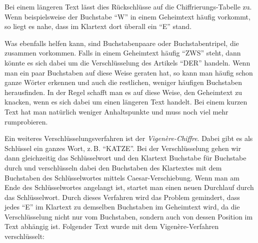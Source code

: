 \documentclass[a4paper,ngerman,12pt]{scrartcl}
\theoremstyle{definition}
\begin{document}
Bei einem längeren Text lässt dies Rückschlüsse auf die Chiffrierungs-Tabelle zu. Wenn beispielsweise der Buchstabe "`W"' in einem Geheimtext häufig vorkommt, so liegt es nahe, dass im Klartext dort überall ein "`E"' stand.

Was ebenfalls helfen kann, sind Buchstabenpaare oder Buchstabentripel, die zusammen vorkommen. Falls in einem Geheimtext häufig "`ZWS"' steht, dann könnte es sich dabei um die Verschlüsselung des Artikels "`DER"' handeln. Wenn man ein paar Buchstaben auf diese Weise geraten hat, so kann man häufig schon ganze Wörter erkennen und auch die restlichen, weniger häufigen Buchstaben herausfinden. In der Regel schafft man es auf diese Weise, den Geheimtext zu knacken, wenn es sich dabei um einen längeren Text handelt. Bei einem kurzen Text hat man natürlich weniger Anhaltspunkte und muss noch viel mehr rumprobieren.

Ein weiteres Verschlüsselungsverfahren ist der \emph{Vigenère-Chiffre}. Dabei gibt es als Schlüssel ein ganzes Wort, z.\,B. "`KATZE"'. Bei der Verschlüsselung gehen wir dann gleichzeitig das Schlüsselwort und den Klartext Buchstabe für Buchstabe durch und verschlüsseln dabei den Buchstaben des Klartextes mit dem Buchstaben des Schlüsselwortes mittels Caesar-Verschiebung. Wenn man am Ende des Schlüsselwortes angelangt ist, startet man einen neuen Durchlauf durch das Schlüsselwort. Durch dieses Verfahren wird das Problem gemindert, dass jedes "`E"' im Klartext zu demselben Buchstaben im Geheimtext wird, da die Verschlüsselung nicht nur vom Buchstaben, sondern auch von dessen Position im Text abhängig ist. Folgender Text wurde mit dem Vigenère-Verfahren verschlüsselt:
\end{document}
